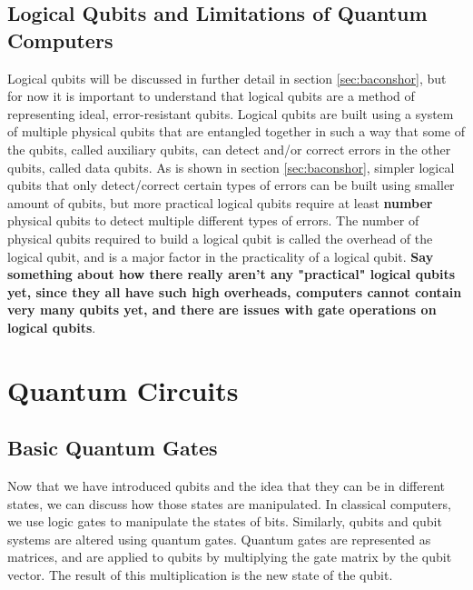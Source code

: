 \documentclass{article}
\begin{document}
\subsection{Logical Qubits and Limitations of Quantum Computers}
\label{sec:logicalqubitsbrief}
Logical qubits will be discussed in further detail in section \ref{sec:baconshor}, but for now it is important to understand that logical qubits are a method of representing
ideal, error-resistant qubits. Logical qubits are built using a system of multiple physical qubits that are entangled together in such a way that some of the qubits, called 
auxiliary qubits, can detect and/or correct errors in the other qubits, called data qubits. As is shown in section \ref{sec:baconshor}, simpler logical qubits that only 
detect/correct certain types of errors can be built using smaller amount of qubits, but more practical logical qubits require at least \textbf{number} physical qubits to detect
multiple different types of errors. The number of physical qubits required to build a logical qubit is called the overhead of the logical qubit, and is a major factor in the
practicality of a logical qubit. \textbf{Say something about how there really aren't any "practical" logical qubits yet, since they all have such high overheads, computers 
cannot contain very many qubits yet, and there are issues with gate operations on logical qubits}.













\section{Quantum Circuits}
\label{sec:quantumcircuits}



\subsection{Basic Quantum Gates}
\label{sec:basicgates}
Now that we have introduced qubits and the idea that they can be in different states, we can discuss how those states are manipulated. In classical computers, we use logic
gates to manipulate the states of bits. Similarly, qubits and qubit systems are altered using quantum gates. Quantum gates are represented as matrices, and are applied to
qubits by multiplying the gate matrix by the qubit vector. The result of this multiplication is the new state of the qubit.
\end{document}
